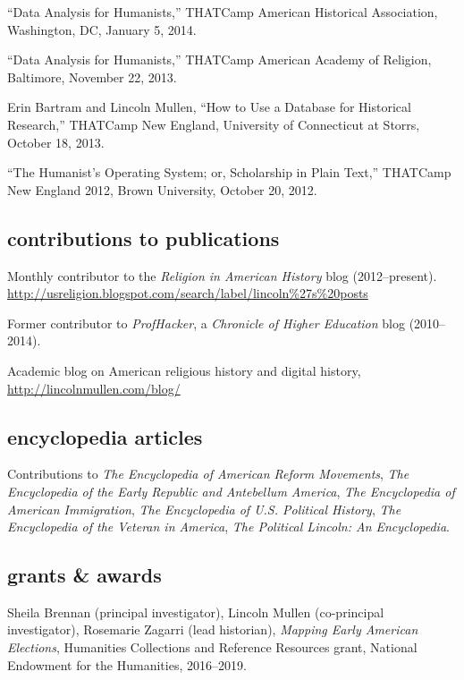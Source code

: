 \documentclass[11pt]{article}
\begin{document}
``Data Analysis for Humanists,'' THATCamp American Historical Association, 
Washington, DC, January 5, 2014.

``Data Analysis for Humanists,'' THATCamp American Academy of Religion, 
Baltimore, November 22, 2013.

Erin Bartram and Lincoln Mullen, ``How to Use a Database for Historical 
Research,'' THATCamp New England, University of Connecticut at Storrs, October 
18, 2013.

``The Humanist's Operating System; or, Scholarship in Plain Text,'' THATCamp 
New England 2012, Brown University, October 20, 2012.


\subsection{contributions to
  publications}\label{contributions-to-publications}

Monthly contributor to the \emph{Religion in American History} blog (2012--present). \url{http://usreligion.blogspot.com/search/label/lincoln\%27s\%20posts}

Former contributor to \emph{ProfHacker}, a \emph{Chronicle of Higher 
  Education} blog (2010--2014). 

Academic blog on American religious history and digital history, 
\url{http://lincolnmullen.com/blog/}

\subsection{encyclopedia articles}\label{encyclopedia-articles}

Contributions to \emph{The Encyclopedia of American Reform Movements},
\emph{The Encyclopedia of the Early Republic and Antebellum America},
\emph{The Encyclopedia of American Immigration},
\emph{The Encyclopedia of U.S. Political History},
\emph{The Encyclopedia of the Veteran in America},
\emph{The Political Lincoln: An Encyclopedia}.

\subsection{grants \& awards}\label{grants-awards}

Sheila Brennan (principal investigator), Lincoln Mullen (co-principal 
investigator), Rosemarie Zagarri (lead historian), \emph{Mapping Early 
  American Elections}, Humanities Collections and Reference Resources grant, 
National Endowment for the Humanities, 2016--2019.
\end{document}
